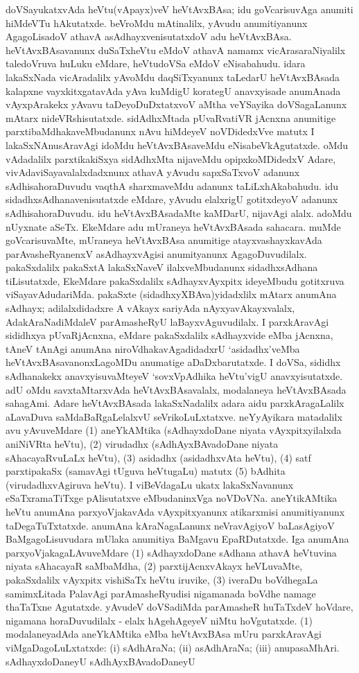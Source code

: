 doVSayukatxvAda heVtu(vApayx)veV heVtAvxBAsa; idu goVcarisuvAga anu\-miti hiMdeVTu hAkutatxde. beVroMdu mAtinalilx, yAvudu anumitiyanunx AgagoLi\-sadoV athavA asAdhayxvenisutatxdoV adu heVtAvxBAsa. heVtAvxBAsavanunx duSaTxheVtu eMdoV athavA namamx vicArasaraNiyalilx taledoVruva huLuku eMdare, heVtu\-doVSa eMdoV eNisabahudu. idara lakaSxNada vicAradalilx yAvoMdu daqSiTxyanunx taLedarU heVtAvxBAsada kalapxne vayxkitxgatavAda yAva kuMdigU korategU anavxyisade anumAnada vAyxpArakekx yAvavu taDeyoDuDxtatxvoV aMtha veYSayika doVSagaLanunx mAtarx nideVRshi\-sutatxde. sidAdhxMtada pUvaRvatiVR jAcnxna anumitige parxtibaMdhakaveMbudanunx nAvu hiMdeyeV noVDidedxVve matutx I lakaSxNAnusAravAgi idoMdu heVtAvxBAsaveMdu eNisabeVkAgutatxde. oMdu vAdadalilx parxtikakiSxya sidAdhxMta nijaveMdu opipx\-koMDi\-dedxV Adare, vivAdaviSayavalalxdadxnunx athavA yAvudu sapxSaTxvoV adanunx sAdhisahoraDuvudu vaqthA sharxmaveMdu adanunx taLiLxhAkabahudu. idu sidadhxsAdhanavenisutatxde \hbox{eMdare}, yAvudu elalxrigU gotitxdeyoV adanunx sAdhisahoraDuvudu. idu heVtAvx\-BAsa\-daMte kaMDarU, nijavAgi alalx. adoMdu nUyxnate aSeTx. EkeMdare adu mUra\-neya heVtAvxBAsada sahacara. muMde goVcarisuvaMte, mUraneya heVtAvxBAsa anu\-mitige atayxvashayxkavAda parAvasheRyanenxV asAdhayxvAgisi anumityanunx AgagoDuvu\-dilalx. pakaSxdalilx pakaSxtA lakaSxNaveV ilalxveMbudanunx sidadhxsAdhana tiLisutatxde, EkeMdare pakaSxdalilx sAdhayxvAyxpitx ideyeMbudu gotitxruva viSayavAdudariMda. pakaSxte (sidadhxyXBAva)yidadxlilx mAtarx anumAna sAdhayx; adilalxdidadxre A vAkayx sariyAda nAyxyavAkayxvalalx, AdakAraNa\-diMdaleV parAmasheRyU laBayxvAguvudilalx. I parxkAravAgi sididhxya pUvaR\-jAcnxna, eMdare pakaSxdalilx sAdhayxvide eMba jAcnxna, tAneV tAnAgi anumAna niroVdhaka\-vAga\-didadxrU `asidadhx'veMba heVtAvxBAsavanonxLagoMDu anumatige aDaDxbarutatxde. I doVSa, sididhx sAdhanakekx anavxyisuvaMteyeV `sovxVpAdhika heVtu'vigU anavxyisutatxde. adU oMdu savxtaMtarxvAda heVtAvxBAsavalalx, modalaneya heVtAvxBAsada sahagAmi. Adare heVtAvxBAsada lakaSxNadalilx adara aidu parxkAragaLalilx aLavaDuva saMdaBaRgaLelalxvU seVri\-koLuLxtatxve. neYyAyikara matadalilx avu yAvuveMdare (1) aneYkAMtika (sAdhayx\-doDane niyata vAyxpitxyilalxda aniNiVRta heVtu), (2) virudadhx (sAdhAyxBAvadoDane \hbox{niyata} sAhacayaRvuLaLx heVtu), (3) asidadhx (asidadhxvAta heVtu), (4) satf parxtipakaSx (sama\-vAgi tUguva heVtugaLu) matutx (5) bAdhita (virudadhxvAgiruva heVtu). I viBeVdagaLu ukatx lakaSxNavanunx eSaTxramaTiTxge pAlisutatxve eMbudaninxVga noVDoVNa. aneYti\-kAMtika heVtu anumAna parxyoVjakavAda vAyxpitxyanunx atikarxmisi anumitiyanunx taDegaTuTxtatxde. anumAna kAraNagaLanunx neVravAgiyoV baLasAgiyoV BaMgagoLisu\-vudara mUlaka anumitiya BaMgavu EpaRDutatxde. Iga anumAna parxyoVjaka\-gaLAvuveMdare (1) sAdhayxdoDane sAdhana athavA heVtuvina niyata sAhacayaR \hbox{saMbaMdha}, (2) parxtijAcnxvAkayx heVLuvaMte, pakaSxdalilx vAyxpitx vishiSaTx heVtu iruvike, (3) iveraDu boVdhegaLa samimxLitada PalavAgi parAmasheRyudisi nigamanada boVdhe namage thaTaTxne Agutatxde. yAvudeV doVSadiMda parAmasheR huTaTxdeV hoVdare, nigamana horaDuvudilalx - elalx hAgehAgeyeV niMtu hoVgutatxde. (1) modalaneyadAda aneYkAMtika eMba heVtAvxBAsa mUru parxkAravAgi viMgaDagoLuLxtatxde: {\rm(i)} sAdhAraNa; {\rm(ii)} asAdhAraNa; {\rm(iii)} anupasaMhAri. sAdhayxdoDaneyU sAdhAyxBAvadoDaneyU 